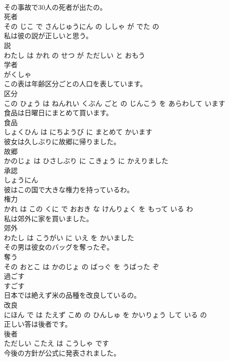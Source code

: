 \documentclass[8pt]{extreport}
\begin{document}
\begin{CJK}{UTF8}{min}
\\	その事故で30人の死者が出たの。	
\\	死者 
\\	その じこ で さんじゅうにん の ししゃ が でた の		
\\	私は彼の説が正しいと思う。	
\\	説 
\\	わたし は かれ の せつ が ただしい と おもう		
\\	学者	
\\	がくしゃ		
\\	この表は年齢区分ごとの人口を表しています。	
\\	区分 
\\	この ひょう は ねんれい くぶん ごと の じんこう を あらわして います		
\\	食品は日曜日にまとめて買います。	
\\	食品 
\\	しょくひん は にちようび に まとめて かいます		
\\	彼女は久しぶりに故郷に帰りました。	
\\	故郷 
\\	かのじょ は ひさしぶり に こきょう に かえりました		
\\	承認	
\\	しょうにん		
\\	彼はこの国で大きな権力を持っているわ。	
\\	権力 
\\	かれ は この くに で おおき な けんりょく を もって いる わ		
\\	私は郊外に家を買いました。	
\\	郊外 
\\	わたし は こうがい に いえ を かいました		
\\	その男は彼女のバッグを奪ったぞ。	
\\	奪う 
\\	その おとこ は かのじょ の ばっぐ を うばった ぞ		
\\	過ごす	
\\	すごす		
\\	日本では絶えず米の品種を改良しているの。	
\\	改良 
\\	にほん で は たえず こめ の ひんしゅ を かいりょう して いる の		
\\	正しい答は後者です。	
\\	後者 
\\	ただしい こたえ は こうしゃ です		
\\	今後の方針が公式に発表されました。	

\end{CJK}
\end{document}
